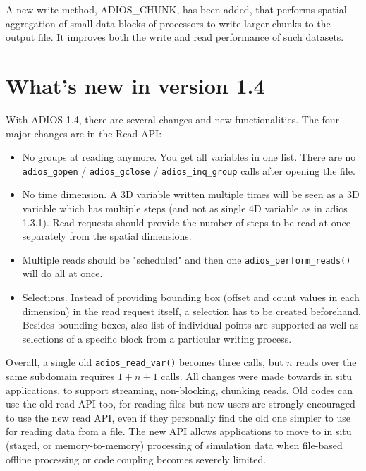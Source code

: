 A new write method, ADIOS\_CHUNK, has been added, that performs spatial aggregation of small data blocks of processors to write larger chunks to the output file. It improves both the write and read performance of such datasets.

\section {What's new in version 1.4}

With ADIOS 1.4, there are several changes and new functionalities. 
The four major changes are in the Read API:

\begin{itemize}
\item No groups at reading anymore. You get all variables in one list.
There are no \verb+adios_gopen+ / \verb+adios_gclose+ / \verb+adios_inq_group+ 
calls after opening the file.
\item No time dimension. A 3D variable written multiple times will be seen as 
a 3D variable which has multiple steps (and not as single 4D variable as in adios 1.3.1).
Read requests should provide the number of steps to be read at once separately from the
spatial dimensions.
\item Multiple reads should be "scheduled" and then one \verb+adios_perform_reads()+ 
will do all at once. 
\item Selections. Instead of providing bounding box (offset and count values
in each dimension) in the read request itself, a selection has to be created 
beforehand. Besides bounding boxes, also list of individual points are supported 
as well as selections of a specific block from a particular writing process.
\end{itemize}

Overall, a single old \verb+adios_read_var()+ becomes three calls, but $n$ reads over the same subdomain requires $1+n+1$ calls.  
All changes were made towards in situ applications, to support streaming, non-blocking, chunking reads. 
Old codes can use the old read API too, for reading files but new users are strongly encouraged to use the new read API, even if they personally find the old one simpler to use for reading data from a file. The new API allows applications to move to in situ (staged, or memory-to-memory) processing of simulation data when file-based offline processing or code coupling becomes severely limited.  

